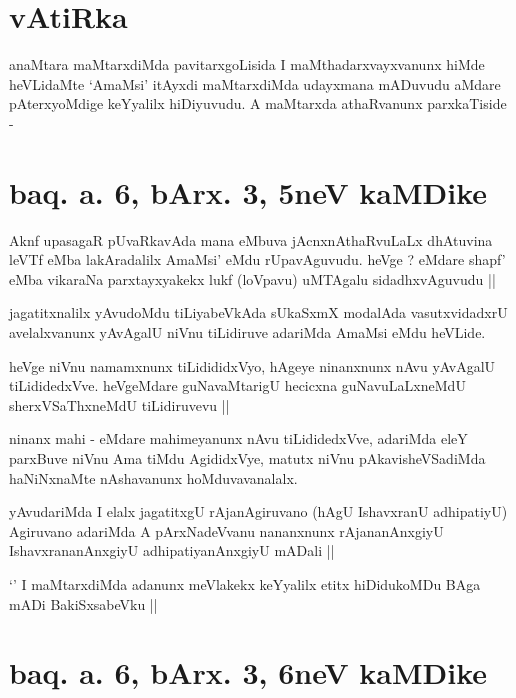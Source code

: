 \section*{vAtiRka}

\begin{artha}
anaMtara maMtarxdiMda pavitarxgoLisida I maMthadarxvayxvanunx hiMde heVLidaMte `AmaMsi' itAyxdi maMtarxdiMda udayxmana mADuvudu aMdare pAterxyoMdige keYyalilx hiDiyuvudu. A maMtarxda athaRvanunx parxkaTiside - 
\end{artha}

\section{baq. a. 6, bArx. 3, 5neV kaMDike}

\begin{artha}
Aknf upasagaR pUvaRkavAda mana eMbuva jAcnxnAthaRvuLaLx dhAtuvina leVTf eMba lakAradalilx AmaMsi' eMdu rUpavAguvudu. heVge ? eMdare shapf' eMba vikaraNa parxtayxyakekx lukf (loVpavu) uMTAgalu sidadhxvAguvudu ||
\end{artha}


\begin{artha}
jagatitxnalilx yAvudoMdu tiLiyabeVkAda sUkaSxmX modalAda vasutxvidadxrU avelalxvanunx yAvAgalU niVnu tiLidiruve adariMda AmaMsi eMdu heVLide.
\end{artha}


\begin{artha}
heVge niVnu namamxnunx tiLidididxVyo, hAgeye ninanxnunx nAvu yAvAgalU tiLididedxVve. heVgeMdare guNavaMtarigU hecicxna guNavuLaLxneMdU sherxVSaThxneMdU tiLidiruvevu ||
\end{artha}


\begin{artha}
ninanx mahi - eMdare mahimeyanunx nAvu tiLididedxVve, adariMda eleY parxBuve niVnu Ama tiMdu AgididxVye, matutx niVnu pAkavisheVSadiMda haNiNxnaMte nAshavanunx hoMduvavanalalx.
\end{artha}

\begin{artha}
yAvudariMda I elalx jagatitxgU rAjanAgiruvano (hAgU IshavxranU adhipatiyU) Agiruvano adariMda A pArxNadeVvanu nananxnunx rAjananAnxgiyU IshavxrananAnxgiyU adhipatiyanAnxgiyU mADali ||
\end{artha}

\begin{artha}
`\stext' I maMtarxdiMda adanunx meVlakekx keYyalilx etitx hiDidukoMDu BAga mADi BakiSxsabeVku ||
\end{artha}

\section{baq. a. 6, bArx. 3, 6neV kaMDike}

